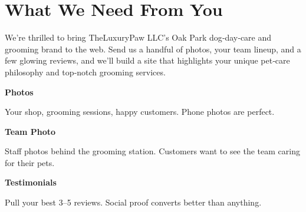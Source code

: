 \documentclass[11pt,letterpaper]{article}
\begin{document}
\vspace{0.2em}

\section*{What We Need From You}

We’re thrilled to bring TheLuxuryPaw LLC’s Oak Park dog‑day‑care and grooming brand to the web. Send us a handful of photos, your team lineup, and a few glowing reviews, and we’ll build a site that highlights your unique pet‑care philosophy and top‑notch grooming services.

\vspace{0.12em}

\noindent\begin{minipage}[t]{0.48\textwidth}
\begin{tcolorbox}[colframe=accent-teal, boxrule=1pt, left=0.7em, right=0.7em, top=0.5em, bottom=0.5em, arc=4pt, boxsep=0pt]
{\bfseries\small\color{accent-teal}Photos}

\vspace{0.15em}

{\small Your shop, grooming sessions, happy customers. Phone photos are perfect.}
\end{tcolorbox}

\vspace{0.1em}

\begin{tcolorbox}[colframe=accent-teal, boxrule=1pt, left=0.7em, right=0.7em, top=0.5em, bottom=0.5em, arc=4pt, boxsep=0pt]
{\bfseries\small\color{accent-teal}Team Photo}

\vspace{0.15em}

{\small Staff photos behind the grooming station. Customers want to see the team caring for their pets.}
\end{tcolorbox}

\vspace{0.1em}

\begin{tcolorbox}[colframe=accent-teal, boxrule=1pt, left=0.7em, right=0.7em, top=0.5em, bottom=0.5em, arc=4pt, boxsep=0pt]
{\bfseries\small\color{accent-teal}Testimonials}

\vspace{0.15em}

{\small Pull your best 3--5 reviews. Social proof converts better than anything.}
\end{tcolorbox}
\end{minipage}
\end{document}
